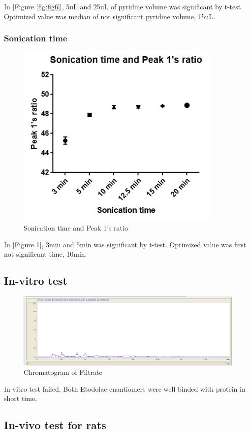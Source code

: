 \documentclass[12pt]{article} %
\begin{document}
In [Figure \ref{fig:fig6}],  5uL and 25uL of pyridine volume was significant by t-test. Optimized value was median of not significant pyridine volume, 15uL.

\subsubsection {Sonication time}

\begin{figure}[h!]
  \centering
  \includegraphics[width=0.6\linewidth]{fig7.png}
  \caption{Sonication time and Peak 1's ratio}
  \label{fig:fig7}
\end{figure}
 In [Figure \ref{fig:fig7}],  3min and 5min was significant by t-test. Optimized value was first not significant time, 10min.



\subsection {In-vitro test}
\begin{figure}[h!]
  \centering
  \includegraphics[width=\linewidth]{f9.png}
  \caption{Chromatogram of Filtrate}
  \label{fig:fig9}
\end{figure}
 In vitro test failed. Both Etodolac enantiomers were well binded with protein in short time.


\subsection {In-vivo test for rats}
\end{document}
